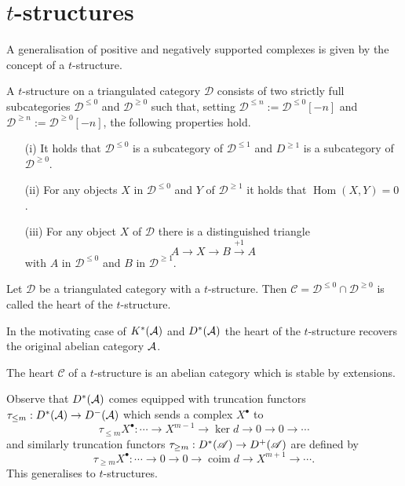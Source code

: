 \section{$t$-structures}
A generalisation of positive and negatively supported complexes is given by the concept of a $t$-structure.
\begin{definition}
 A $t$-structure on a triangulated category $\mathcal{D}$ consists of two strictly full subcategories $\mathcal{D}^{\leq 0}$ and $\mathcal{D}^{\geq 0}$ such that, setting $\mathcal{D}^{\leq n} := \mathcal{D}^{\leq 0}[-n]$ and $\mathcal{D}^{\geq n} := \mathcal{D}^{\geq 0} [-n]$, the following properties hold.
 \begin{enumerate}
   \item[(i)] It holds that $\mathcal{D}^{\leq 0}$ is a subcategory of $\mathcal{D}^{\leq 1}$ and $D^{\geq 1}$ is a subcategory of $\mathcal{D}^{\geq 0}$.
   \item[(ii)] For any objects $X$ in $\mathcal{D}^{\leq 0}$ and $Y$ of $\mathcal{D}^{\geq 1}$ it holds that $\operatorname{Hom}(X,Y) = 0$.
   \item[(iii)] For any object $X$ of $\mathcal{D}$ there is a distinguished triangle
   $$A \to X \to B \xrightarrow{+1} A $$
   with $A$ in $\mathcal{D}^{\leq 0}$ and $B$ in $\mathcal{D}^{\geq 1}$.
 \end{enumerate}
\end{definition}
\begin{definition}
 Let $\mathcal{D}$ be a triangulated category with a $t$-structure. Then $\mathcal{C} = \mathcal{D}^{\leq 0} \cap \mathcal{D}^{\geq 0}$ is called the heart of the $t$-structure.
\end{definition}
In the motivating case of $K^*(\AA)$ and $D^*(\AA)$ the heart of the $t$-structure recovers the original abelian category $\AA$.
\begin{proposition}{\cite[Proposition 5.1.2.]{dimca2004sheaves}}\label{prop: HeartExtension}
 The heart $\mathcal{C}$ of a $t$-structure is an abelian category which is stable by extensions.
\end{proposition}
Observe that $D^*(\AA)$ comes equipped with truncation functors
$\tau_{\leq m}:D^*(\AA)\to D^-(\AA)$ which sends a complex $X^\bullet$ to
$$\tau_{\leq m}X^\bullet : \cdots \to X^{m-1} \to \ker d \to 0 \to 0 \to \cdots$$
and similarly truncation functors $\tau_{\geq m}:D^*(\A)\to D^{+}(\A)$ are defined by
$$\tau_{\geq m}X^\bullet: \cdots \to 0 \to 0 \to \operatorname{coim} d \to X^{m+1}\to \cdots.$$
This generalises to $t$-structures.
